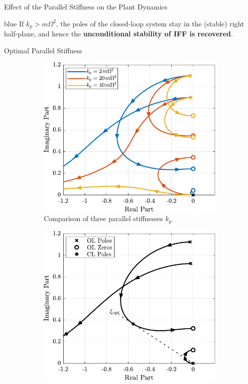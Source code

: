 \documentclass[t, minted]{clean-beamer}
\begin{document}
\begin{frame}[label={sec:org223db59}]{Effect of the Parallel Stiffness on the Plant Dynamics}
\begin{cbox}[]{blue}{}
If \(k_p > m \Omega^2\), the poles of the closed-loop system stay in the (stable) right half-plane, and hence the \textbf{unconditional stability of IFF is recovered}.
\end{cbox}
\end{frame}

\begin{frame}[label={sec:org8be51fd}]{Optimal Parallel Stiffness}
\begin{figure}[htbp]
\begin{subfigure}[c]{0.49\linewidth}
\includegraphics[width=\linewidth]{figs/root_locus_iff_kps.pdf}
\caption{\label{fig:root_locus_iff_kps} Comparison of three parallel stiffnesses \(k_p\)}
\end{subfigure}
\hfill
\begin{subfigure}[c]{0.49\linewidth}
\includegraphics[width=\linewidth]{figs/root_locus_opt_gain_iff_kp.pdf}

\end{subfigure}
\end{figure}
\end{frame}
\end{document}
